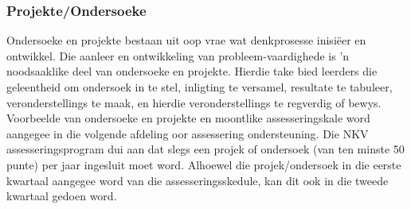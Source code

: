 \subsubsection{Projekte/Ondersoeke}

Ondersoeke en projekte bestaan ​​uit oop vrae wat denkprosesse
inisi\"{e}er en ontwikkel. Die aanleer en ontwikkeling van
probleem-vaardighede is 'n noodsaaklike deel van ondersoeke en
projekte. Hierdie take bied leerders die geleentheid om ondersoek in
te stel, inligting te versamel, resultate te tabuleer,
veronderstellings te maak, en hierdie veronderstellings te regverdig
of bewys. Voorbeelde van ondersoeke en projekte en moontlike
assesseringskale word aangegee in die volgende afdeling oor
assessering ondersteuning. Die NKV assesseringsprogram dui aan dat
slegs een projek of ondersoek (van ten minste 50 punte) per jaar
ingesluit moet word. Alhoewel die projek/ondersoek in die eerste
kwartaal aangegee word van die assesseringsskedule, kan dit ook in die
tweede kwartaal gedoen word.


